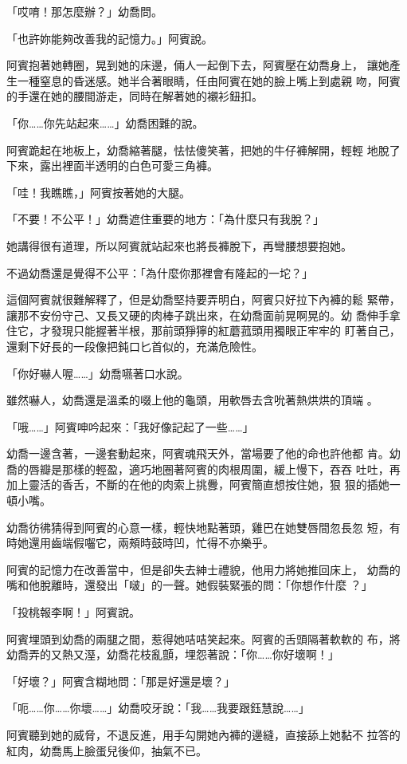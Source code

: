 「哎唷！那怎麼辦？」幼喬問。

「也許妳能夠改善我的記憶力。」阿賓說。

阿賓抱著她轉圈，晃到她的床邊，倆人一起倒下去，阿賓壓在幼喬身上，
讓她產生一種窒息的昏迷感。她半合著眼睛，任由阿賓在她的臉上嘴上到處親
吻，阿賓的手還在她的腰間游走，同時在解著她的襯衫鈕扣。

「你……你先站起來……」幼喬困難的說。

阿賓跪起在地板上，幼喬縮著腿，怯怯傻笑著，把她的牛仔褲解開，輕輕
地脫了下來，露出裡面半透明的白色可愛三角褲。

「哇！我瞧瞧，」阿賓按著她的大腿。

「不要！不公平！」幼喬遮住重要的地方：「為什麼只有我脫？」

她講得很有道理，所以阿賓就站起來也將長褲脫下，再彎腰想要抱她。

不過幼喬還是覺得不公平：「為什麼你那裡會有隆起的一坨？」

這個阿賓就很難解釋了，但是幼喬堅持要弄明白，阿賓只好拉下內褲的鬆
緊帶，讓那不安份守己、又長又硬的肉棒子跳出來，在幼喬面前晃啊晃的。幼
喬伸手拿住它，才發現只能握著半根，那前頭猙獰的紅蘑菰頭用獨眼正牢牢的
盯著自己，還剩下好長的一段像把鈍口匕首似的，充滿危險性。

「你好嚇人喔……」幼喬嚥著口水說。

雖然嚇人，幼喬還是溫柔的啜上他的龜頭，用軟唇去含吮著熱烘烘的頂端
。

「哦……」阿賓呻吟起來：「我好像記起了一些……」

幼喬一邊含著，一邊套動起來，阿賓魂飛天外，當場要了他的命也許他都
肯。幼喬的唇瓣是那樣的輕盈，適巧地圈著阿賓的肉根周圍，緩上慢下，吞吞
吐吐，再加上靈活的香舌，不斷的在他的肉索上挑釁，阿賓簡直想按住她，狠
狠的插她一頓小嘴。

幼喬彷彿猜得到阿賓的心意一樣，輕快地點著頭，雞巴在她雙唇間忽長忽
短，有時她還用齒端假囓它，兩頰時鼓時凹，忙得不亦樂乎。

阿賓的記憶力在改善當中，但是卻失去紳士禮貌，他用力將她推回床上，
幼喬的嘴和他脫離時，還發出「啵」的一聲。她假裝緊張的問：「你想作什麼
？」

「投桃報李啊！」阿賓說。

阿賓埋頭到幼喬的兩腿之間，惹得她咭咭笑起來。阿賓的舌頭隔著軟軟的
布，將幼喬弄的又熱又溼，幼喬花枝亂顫，埋怨著說：「你……你好壞啊！」

「好壞？」阿賓含糊地問：「那是好還是壞？」

「呃……你……你壞……」幼喬咬牙說：「我……我要跟鈺慧說……」

阿賓聽到她的威脅，不退反進，用手勾開她內褲的邊縫，直接舔上她黏不
拉答的紅肉，幼喬馬上臉蛋兒後仰，抽氣不已。

